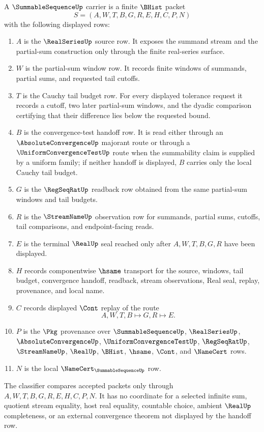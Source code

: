\begin{definition}
\label{def:summable-sequence-carrier}
A $\SummableSequenceUp$ carrier is a finite $\BHist$ packet
$$
S=(A,W,T,B,G,R,E,H,C,P,N)
$$
with the following displayed rows:
\begin{enumerate}
\item $A$ is the $\RealSeriesUp$ source row. It exposes the summand stream and the partial-sum construction only through the finite real-series surface.
\item $W$ is the partial-sum window row. It records finite windows of summands, partial sums, and requested tail cutoffs.
\item $T$ is the Cauchy tail budget row. For every displayed tolerance request it records a cutoff, two later partial-sum windows, and the dyadic comparison certifying that their difference lies below the requested bound.
\item $B$ is the convergence-test handoff row. It is read either through an $\AbsoluteConvergenceUp$ majorant route or through a $\UniformConvergenceTestUp$ route when the summability claim is supplied by a uniform family; if neither handoff is displayed, $B$ carries only the local Cauchy tail budget.
\item $G$ is the $\RegSeqRatUp$ readback row obtained from the same partial-sum windows and tail budgets.
\item $R$ is the $\StreamNameUp$ observation row for summands, partial sums, cutoffs, tail comparisons, and endpoint-facing reads.
\item $E$ is the terminal $\RealUp$ seal reached only after $A,W,T,B,G,R$ have been displayed.
\item $H$ records componentwise $\hsame$ transport for the source, windows, tail budget, convergence handoff, readback, stream observations, Real seal, replay, provenance, and local name.
\item $C$ records displayed $\Cont$ replay of the route
$$
A,W,T,B \longmapsto G,R \longmapsto E .
$$
\item $P$ is the $\Pkg$ provenance over $\SummableSequenceUp$, $\RealSeriesUp$, $\AbsoluteConvergenceUp$, $\UniformConvergenceTestUp$, $\RegSeqRatUp$, $\StreamNameUp$, $\RealUp$, $\BHist$, $\hsame$, $\Cont$, and $\NameCert$ rows.
\item $N$ is the local $\NameCert_{\SummableSequenceUp}$ row.
\end{enumerate}
The classifier compares accepted packets only through $A,W,T,B,G,R,E,H,C,P,N$. It has no coordinate for a selected infinite sum, quotient stream equality, host real equality, countable choice, ambient $\RealUp$ completeness, or an external convergence theorem not displayed by the handoff row.
\end{definition}

